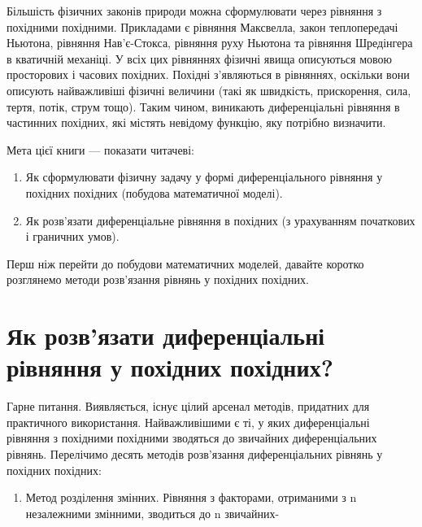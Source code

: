 \documentclass[
]{article}
\providecommand{\tightlist}{%
  \setlength{\itemsep}{0pt}\setlength{\parskip}{0pt}}
\begin{document}
Більшість фізичних законів природи можна сформулювати через рівняння з
похідними похідними. Прикладами є рівняння Максвелла, закон
теплопередачі Ньютона, рівняння Нав'є-Стокса, рівняння руху Ньютона та
рівняння Шредінгера в кватичній механіці. У всіх цих рівняннях фізичні
явища описуються мовою просторових і часових похідних. Похідні
з'являються в рівняннях, оскільки вони описують найважливіші фізичні
величини (такі як швидкість, прискорення, сила, тертя, потік, струм
тощо). Таким чином, виникають диференціальні рівняння в частинних
похідних, які містять невідому функцію, яку потрібно визначити.

Мета цієї книги --- показати читачеві:

\begin{enumerate}
\def\labelenumi{\arabic{enumi}.}
\item
  Як сформулювати фізичну задачу у формі диференціального рівняння у
  похідних похідних (побудова математичної моделі).
\item
  Як розв'язати диференціальне рівняння в похідних (з урахуванням
  початкових і граничних умов).
\end{enumerate}

Перш ніж перейти до побудови математичних моделей, давайте коротко
розглянемо методи розв'язання рівнянь у похідних похідних.

\section{Як розв'язати диференціальні рівняння у похідних
похідних?}\label{ux44fux43a-ux440ux43eux437ux432ux44fux437ux430ux442ux438-ux434ux438ux444ux435ux440ux435ux43dux446ux456ux430ux43bux44cux43dux456-ux440ux456ux432ux43dux44fux43dux43dux44f-ux443-ux43fux43eux445ux456ux434ux43dux438ux445-ux43fux43eux445ux456ux434ux43dux438ux445}

Гарне питання. Виявляється, існує цілий арсенал методів, придатних для
практичного використання. Найважливішими є ті, у яких диференціальні
рівняння з похідними похідними зводяться до звичайних диференціальних
рівнянь. Перелічимо десять методів розв'язання диференціальних рівнянь у
похідних похідних:

\begin{enumerate}
\def\labelenumi{\arabic{enumi}.}
\tightlist
\item
  Метод розділення змінних. Рівняння з факторами, отриманими з n
  незалежними змінними, зводиться до n звичайних-
\end{enumerate}
\end{document}
